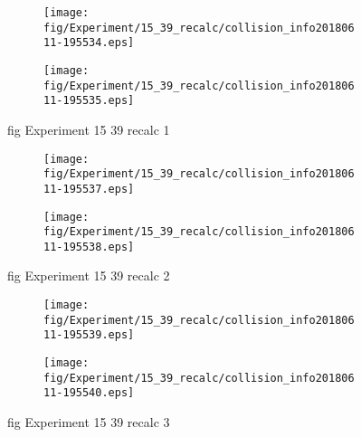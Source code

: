 \begin{figure}[H]
	\centering
	\begin{subfigure}[b]{0.9\textwidth}
		\texttt{[image: fig/Experiment/15\_39\_recalc/collision\_info20180611-195534.eps]}
		\caption{}
		\label{fig:Experiment:15_39_recalc:collision_info20180611-195534}
	\end{subfigure}

	\begin{subfigure}[b]{0.9\textwidth}
		\texttt{[image: fig/Experiment/15\_39\_recalc/collision\_info20180611-195535.eps]}
		\caption{}
		\label{fig:Experiment:15_39_recalc:collision_info20180611-195535}
	\end{subfigure}
	\caption{fig Experiment 15 39 recalc 1}
	\label{fig:Experiment:15_39_recalc:1}
\end{figure}

\begin{figure}[H]
	\centering
	\begin{subfigure}[b]{0.9\textwidth}
		\texttt{[image: fig/Experiment/15\_39\_recalc/collision\_info20180611-195537.eps]}
		\caption{}
		\label{fig:Experiment:15_39_recalc:collision_info20180611-195537}
	\end{subfigure}

	\begin{subfigure}[b]{0.9\textwidth}
		\texttt{[image: fig/Experiment/15\_39\_recalc/collision\_info20180611-195538.eps]}
		\caption{}
		\label{fig:Experiment:15_39_recalc:collision_info20180611-195538}
	\end{subfigure}
	\caption{fig Experiment 15 39 recalc 2}
	\label{fig:Experiment:15_39_recalc:2}
\end{figure}

\begin{figure}[H]
	\centering
	\begin{subfigure}[b]{0.9\textwidth}
		\texttt{[image: fig/Experiment/15\_39\_recalc/collision\_info20180611-195539.eps]}
		\caption{}
		\label{fig:Experiment:15_39_recalc:collision_info20180611-195539}
	\end{subfigure}

	\begin{subfigure}[b]{0.9\textwidth}
		\texttt{[image: fig/Experiment/15\_39\_recalc/collision\_info20180611-195540.eps]}
		\caption{}
		\label{fig:Experiment:15_39_recalc:collision_info20180611-195540}
	\end{subfigure}
	\caption{fig Experiment 15 39 recalc 3}
	\label{fig:Experiment:15_39_recalc:3}
\end{figure}


